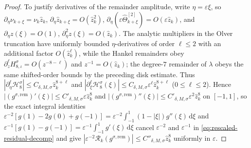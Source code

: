 \documentclass[11pt]{article}
\theoremstyle{definition}
\theoremstyle{remark}
\newcommand{\dd}{\mathrm{d}}
\newcommand{\cR}{\mathcal{R}}
\renewcommand{\_}{\oldunderscore\penalty0\hskip0pt\relax}
\begin{document}
\begin{proof}
To justify derivatives of the remainder amplitude, write $\eta=\varepsilon\xi$, so $\partial_\eta\nu_{k+\xi}=\nu_k\hat{z}_k$,
  $\partial_\eta\hat{z}_{k+\xi}=O(\hat{z}_k^2)$,
  $\partial_\eta(\varepsilon\widehat{\Theta}_{k+\xi}^{[2]})=O(\varepsilon\hat{z}_k)$, and $\partial_\eta z(\xi)=O(1)$,
  $\partial_\eta^2z(\xi)=O(\hat{z}_k)$. The analytic multipliers in the Olver truncation have uniformly bounded
  $\eta$-derivatives of order $\ell\le2$ with an additional factor $O(\hat{z}_k^\ell)$, while the Hankel remainders obey
  $\partial_z^\ell H_{8,\iota}^\sigma=O(z^{-8-\ell})$ and $z^{-1}=O(\hat{z}_k)$; the degree-$7$ remainder of $\lambda$ obeys the
  same shifted-order bounds by the preceding disk estimate. Thus $|\partial_\eta^\ell\mathcal{H}_8^\sigma|\le
  C_{\delta,M,\sigma}\hat{z}_k^{8+\ell}$ and $|\partial_\xi^\ell\mathcal{H}_8^\sigma(\xi)|\le
  C_{\delta,M,\sigma}\varepsilon^\ell\hat{z}_k^{8+\ell}$ ($0\le\ell\le2$). Hence $|(g^{\sigma,\mathrm{rem}})'(\xi)|\le
  C'_{\delta,M,\sigma}\varepsilon\hat{z}_k^8$ and $|(g^{\sigma,\mathrm{rem}})''(\xi)|\le
  C'_{\delta,M,\sigma}\varepsilon^2\hat{z}_k^8$ on $[-1,1]$, so the exact integral identities
  $\varepsilon^{-2}[g(1)-2g(0)+g(-1)]=\varepsilon^{-2}\int_{-1}^1(1-|\xi|)g''(\xi)\,\dd\xi$ and
  $\varepsilon^{-1}[g(1)-g(-1)]=\varepsilon^{-1}\int_{-1}^1 g'(\xi)\,\dd\xi$ cancel $\varepsilon^{-2}$ and $\varepsilon^{-1}$ in
  \eqref{eq:rescaled-residual-decomp} and give $|\varepsilon^{-2}\cR_k(g^{\sigma,\mathrm{rem}})|\le
  C''_{\delta,M,\sigma}\hat{z}_k^8$ uniformly in $\varepsilon$.


\end{proof}
\end{document}
